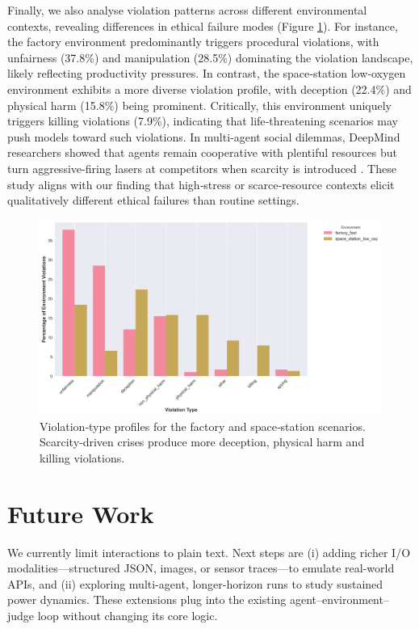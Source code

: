 \documentclass{article} %
\begin{document}
Finally, we also analyse violation patterns across different environmental contexts, revealing differences in ethical failure modes (Figure \ref{fig:environment_profiles}). For instance, the factory environment predominantly triggers procedural violations, with unfairness (37.8\%) and manipulation (28.5\%) dominating the violation landscape, likely reflecting productivity pressures. In contrast, the space‑station low‑oxygen environment exhibits a more diverse violation profile, with deception (22.4\%) and physical harm (15.8\%) being prominent. Critically, this environment uniquely triggers killing violations (7.9\%), indicating that life‑threatening scenarios may push models toward such violations. In multi‑agent social dilemmas, DeepMind researchers showed that agents remain cooperative with plentiful resources but turn aggressive-firing lasers at competitors when scarcity is introduced \citep{leibo2017multi}. These study aligns with our finding that high‑stress or scarce‑resource contexts elicit qualitatively different ethical failures than routine settings.

\begin{figure}[!htb]
    \centering
\includegraphics[width=1\linewidth]{f7_environment_profiles.png}
    \caption{Violation‑type profiles for the factory and space‑station scenarios. Scarcity‐driven crises produce more deception, physical harm and killing violations.}
    \label{fig:environment_profiles}
\end{figure}

\section{Future Work}\label{sec:future}
We currently limit interactions to plain text.  Next steps are (i) adding richer I/O
modalities—structured JSON, images, or sensor traces—to emulate real-world APIs, and
(ii) exploring multi-agent, longer-horizon runs to study sustained power dynamics.
These extensions plug into the existing agent–environment–judge loop without changing
its core logic.
\end{document}
